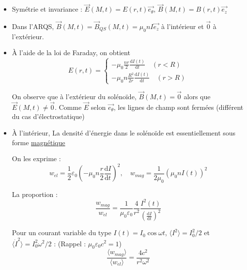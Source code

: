 \begin{itemize}

    \item  Symétrie et invariance : $\overrightarrow{E}(M,t) = E(r,t) \overrightarrow{e_ \theta}$, $\overrightarrow{B}(M,t) = B(r,t) \overrightarrow{e_z}$ 

    \item Dans l'ARQS, $\overrightarrow{B}(M,t) = \overrightarrow{B} _{QS}(M,t) = \mu_0 n I \overrightarrow{e_z}$ à l'intérieur et $\overrightarrow{0}$ à l'extérieur.

    \item À l'aide de la loi de Faraday, on obtient 
      \begin{equation}
        E(r,t) = \begin{cases}
          - \mu_0 \frac{nr}{2}  \frac{\mathrm{d}I(t)}{\mathrm{d}t}  \quad (r<R) \\ 
          - \mu_0 n \frac{R ^{2}}{2r}  \frac{\mathrm{d}I(t)}{\mathrm{d}t}  \quad (r>R)
        \end{cases}
      \end{equation}

      \begin{tcolorbox}
          On observe que à l'extérieur du solénoïde, $\overrightarrow{B}(M,t) = \overrightarrow{0}$ alors que $\overrightarrow{E}(M,t) \ne \overrightarrow{0}$. Comme $\overrightarrow{E}$ selon $\overrightarrow{e_ \theta}$, les lignes de champ sont fermées (différent du cas d'électrostatique)
      \end{tcolorbox}

    \item À l'intérieur, La densité d'énergie dans le solénoïde est essentiellement sous forme \underline{magnétique}
      \begin{myproof}{}{}
      On les exprime : 
      \begin{equation}
        w _{el} = \frac{1}{2}  \varepsilon_0 \left( - \mu_0 n \frac{r}{2} \frac{\mathrm{d}I}{\mathrm{d}t} \right) ^{2}, \quad w _{mag} = \frac{1}{2 \mu_0}  (\mu_0 n I(t)) ^{2}
      \end{equation}

      La proportion : 
      \begin{equation}
        \frac{w _{mag}}{w _{el}} = \frac{1}{\mu_0 \varepsilon_0}  \frac{4}{r ^{2}}  \frac{I ^{2}(t)}{ \left( \frac{\mathrm{d}I}{\mathrm{d}t}  \right) ^{2}       } 
      \end{equation}

      Pour un courant variable du type $I(t) = I_0 \cos \omega t$, $\langle I ^{2} \rangle = I_0 ^{2}/ 2$ et $\langle \dot{I}^{2}\rangle = I_0 ^{2} \omega ^{2}/2$ : (Rappel : $\mu_0 \varepsilon_0 c ^{2} = 1$)
      \begin{equation}
        \frac{ \langle w _{mag} \rangle}{ \langle w _{el} \rangle} = \frac{4 c ^{2}}{r ^{2} \omega ^{2}} 
      \end{equation}


\end{myproof}
\end{itemize}
